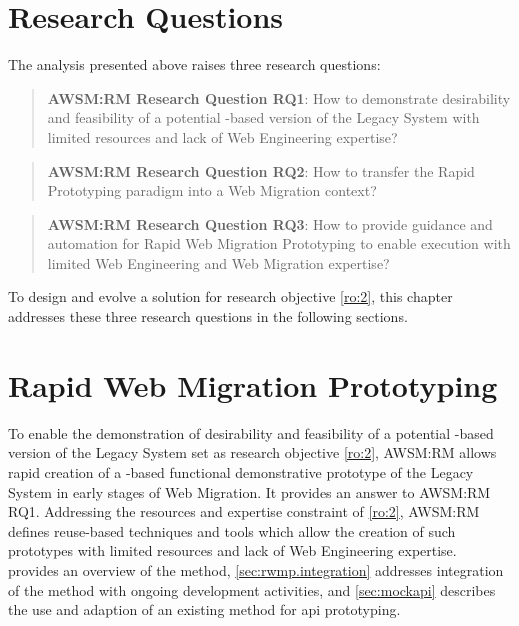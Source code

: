 \vspace{-28pt}
\hypertarget{sec:rm.research-questions}{%
\section{Research Questions}\label{sec:rm.research-questions}}
\vspace{10pt}

The analysis presented above raises three research questions:

\begin{quote}
\textbf{AWSM:RM Research Question RQ1}: How to demonstrate desirability and feasibility of a potential -based version of the \gls{Legacy System} with limited resources and lack of \gls{Web Engineering} expertise?
\end{quote}
\vspace{-4pt}

\begin{quote}
\textbf{AWSM:RM Research Question RQ2}: How to transfer the \gls{Rapid Prototyping} paradigm into a \gls{Web Migration} context?
\end{quote}
\vspace{-4pt}

\begin{quote}
\textbf{AWSM:RM Research Question RQ3}: How to provide guidance and automation for \gls{Rapid Web Migration Prototyping} to enable execution with limited \gls{Web Engineering} and \gls{Web Migration} expertise?
\end{quote}
\vspace{-4pt}

To design and evolve a solution for research objective \cref{ro:2}, this chapter addresses these three research questions in the following sections.

\vspace{-15pt}
\hypertarget{sec:rwmp}{%
\section{Rapid Web Migration Prototyping}\label{sec:rwmp}}
\vspace{15pt}

To enable the demonstration of desirability and feasibility of a potential -based version of the \gls{Legacy System} set as research objective \cref{ro:2}, AWSM:RM allows rapid creation of a -based functional demonstrative prototype of the \gls{Legacy System} in early stages of \gls{Web Migration}.
It provides an answer to AWSM:RM RQ1.
Addressing the resources and expertise constraint of \cref{ro:2}, AWSM:RM defines reuse-based techniques and tools which allow the creation of such prototypes with limited resources and lack of \gls{Web Engineering} expertise.  provides an overview of the method, \cref{sec:rwmp.integration} addresses integration of the method with ongoing development activities, and \cref{sec:mockapi} describes the use and adaption of an existing method for \gls{api} prototyping.

